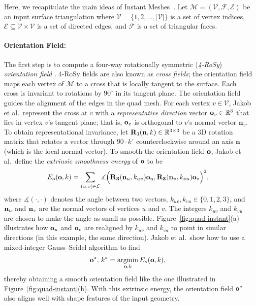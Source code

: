 Here, we recapitulate the main ideas of Instant Meshes~\cite{jakob2015instant}.  Let $\mathcal{M} = (\mathcal{V}, \mathcal{F}, \mathcal{E})$ be an input surface triangulation where $\mathcal{V} = \{ 1, 2, \ldots, |\mathcal{V}| \}$ is a set of vertex indices, $\mathcal{E} \subseteq \mathcal{V} \times \mathcal{V}$ is a set of directed edges, and $\mathcal{F}$ is a set of triangular faces.

\paragraph*{Orientation Field:}
The first step is to compute a four-way rotationally symmetric (\emph{4-RoSy}) \emph{orientation field} \cite{ray2008n}. 4-RoSy fields are also known as \emph{cross fields}; the orientation field maps each vertex of $\mathcal{M}$ to a cross that is locally tangent to the surface. Each cross is invariant to rotations by $90^\circ$ in its tangent plane. The orientation field guides the alignment of the edges in the quad mesh. For each vertex $v \in \mathcal{V}$, Jakob et al.\ represent the cross at $v$ with a \emph{representative direction} vector $\mathbf{o}_v \in \mathbb{R}^3$ that lies in vertex $v$'s tangent plane; that is, $\mathbf{o}_v$ is orthogonal to $v$'s normal vector $\mathbf{n}_v$. To obtain representational invariance, let $\mathbf{R}_3(\textbf{n}, k) \in \mathbb{R}^{3 \times 3}$ be a 3D rotation matrix that rotates a vector through $90 \cdot k^\circ$ counterclockwise around an axis $\textbf{n}$ (which is the local normal vector). To smooth the orientation field $\mathbf{o}$, Jakob et al.\ define the \emph{extrinsic smoothness \mbox{energy}} of $\mathbf{o}$ to be
\begin{equation*}
E_o(\mathbf{o}, k) = \sum_{(u,v) \in \mathcal{E}}
\measuredangle \Big(\mathbf{R_3} (\textbf{n}_u,k_{uv}) \mathbf{o}_u, \mathbf{R_3} (\textbf{n}_v,k_{vu}) \mathbf{o}_v\Big)^2,
\end{equation*}
where $\measuredangle(\cdot, \cdot)$ denotes the angle between two vectors, $k_{uv}, k_{vu} \in \{0, 1, 2, 3\}$, and $\mathbf{n}_u$ and $\mathbf{n}_v$ are the normal vectors of vertices $u$ and $v$. The integers $k_{uv}$ and $k_{vu}$ are chosen to make the angle as small as possible. Figure~\ref{fig:quad-instant}(a) illustrates how $\mathbf{o}_u$ and $\mathbf{o}_v$ are realigned by $k_{uv}$ and $k_{vu}$ to point in similar directions (in this example, the same direction). Jakob et al.\ show how to use a mixed-integer Gauss--Seidel algorithm to find
\begin{equation}
\mathbf{o}^*,\, k^* = \operatorname*{argmin}_{\mathbf{o}, k} E_o(\mathbf{o}, k) \label{eq:quad-im1},
\end{equation}
thereby obtaining a smooth orientation field like the one illustrated in Figure~\ref{fig:quad-instant}(b). With this extrinsic energy, the orientation field $\mathbf{o}^*$ also aligns well with shape features of the input geometry.

